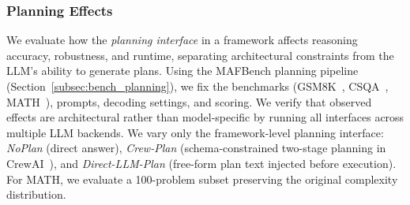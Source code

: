 



% 






\vspace{-1mm}
\subsubsection{Planning Effects}
\label{subsec:planning_results}
We evaluate how the \emph{planning interface} in a framework affects reasoning accuracy, robustness, and runtime, separating architectural constraints from the LLM’s ability to generate plans. Using the MAFBench planning pipeline (Section~\ref{subsec:bench_planning}), we fix the benchmarks (GSM8K~\cite{cobbe2021training}, CSQA~\cite{talmor-etal-2019-commonsenseqa}, MATH~\cite{hendrycks2measuring}), prompts, decoding settings, and scoring. We verify that observed effects are architectural rather than model-specific by running all interfaces across multiple LLM backends. We vary only the framework-level planning interface: \emph{NoPlan} (direct answer), \emph{Crew-Plan} (schema-constrained two-stage planning in CrewAI~\cite{crewai2025}), and \emph{Direct-LLM-Plan} (free-form plan text injected before execution). For MATH, we evaluate a 100-problem subset preserving the original complexity distribution. 


